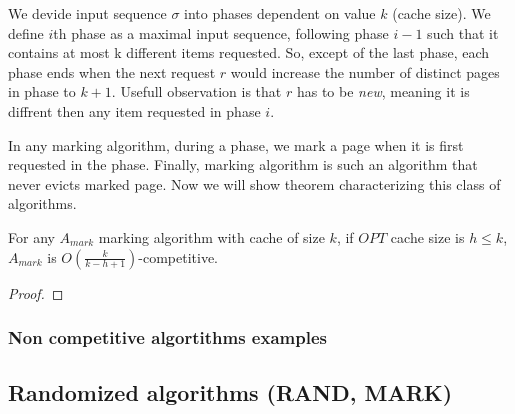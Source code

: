 We devide input sequence $\sigma$ into phases dependent on value $k$ (cache 
size). We define $i$th phase as a maximal input sequence, following phase $i-1$ 
such that it contains at most k different items requested. So, except of the 
last phase, each phase ends when the next request $r$ would increase the number 
of distinct pages in phase to $k+1$. Usefull observation is that $r$ has to be 
\textit{new}, meaning it is diffrent then any item requested in phase $i$.  

In any marking algorithm, during a phase, we mark a page when it is first 
requested in the phase. Finally, marking algorithm is such an algorithm that 
never evicts marked page. Now we will show theorem characterizing this class of 
algorithms.
\begin{theorem}
For any $A_{mark}$ marking algorithm with cache of size $k$, if $OPT$ cache 
size is $h \leq k$, $A_{mark}$ is $O(\frac{k}{k-h+1})$-competitive.
\end{theorem}
\begin{proof}
 
\end{proof}



\subsubsection{Non competitive algortithms examples}

\subsection{Randomized algorithms (RAND, MARK)}